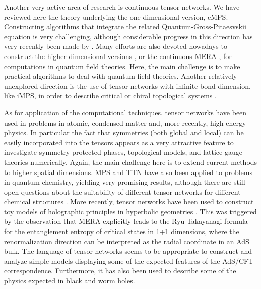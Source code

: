 \documentclass[rmp,aps,reprint,superscriptaddress,nobalancelastpage]{revtex4-1}
\begin{document}
Another very active area of research is continuous tensor networks. We have reviewed here the theory underlying the one-dimensional version, cMPS. Constructing algorithms that integrate the related Quantum-Gross-Pitaesvskii equation \cite{haegeman2017quantum} is very challenging, although considerable progress in this direction has very recently been made by \citet{tuybens2020variational}. Many efforts are also devoted nowadays to construct the higher dimensional versions \cite{tilloy2019continuous}, or the continuous MERA \cite{haegeman2013entanglement,zou2019magic,cotler2019entanglement,fernandez2019entanglement,fernandez:cmera-qft}, for computations in quantum field theories. Here, the main challenge is to make practical algorithms to deal with quantum field theories. Another relatively unexplored direction is the use of tensor networks with infinite bond dimension, like iMPS, in order to describe critical or chiral topological systems \cite{cirac2010infinite,nielsen2013local,tu2014lattice,nielsen2012laughlin}.

As for application of the computational techniques, tensor networks have been used in problems in atomic, condensed matter and, more recently, high-energy physics. In particular the fact that symmetries (both global and local) can be easily incorporated into the tensors appears as a very attractive feature to investigate symmetry protected phases, topological models, and lattice gauge theories numerically. Again, the main challenge here is to extend current methods to higher spatial dimensions. MPS and TTN have also been applied to problems in quantum chemistry, yielding very promising results, although there are still open questions about the suitability of different tensor networks for different chemical structures \cite{white1999ab,chan2011density,szalay2015tensor}. More recently, tensor networks have been used to construct toy models of holographic principles in hyperbolic geometries \cite{swingle:mera-ads-cft,pastawski:holography,hayden:holographic-duality-from-tn}. This was triggered by the observation that MERA explicitly leads to the Ryu-Takayanagi formula for the entanglement entropy of critical states in 1+1 dimensions, where the renormalization direction can be interpreted as the radial coordinate in an AdS bulk. The language of tensor networks seems to be appropriate to construct and analyze simple models displaying some of the expected features of the AdS/CFT correspondence. Furthermore, it has also been used to describe some of the physics expected in black and worm holes.
\end{document}
